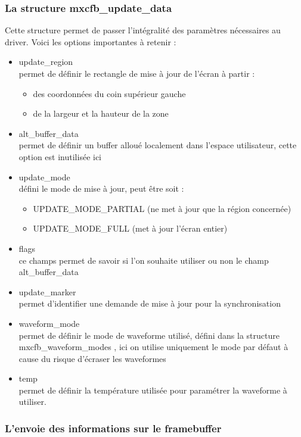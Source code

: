 \subsubsection{La structure mxcfb_update_data}
Cette structure permet de passer l'intégralité des paramètres nécessaires au driver.
Voici les options importantes à retenir : 
\begin{itemize}
	\renewcommand{\labelitemi}{$\bullet$}
	\item update_region \\
		permet de définir le rectangle de mise à jour de l'écran à partir :
		\begin{itemize}
			\item des coordonnées du coin supérieur gauche
			\item de la largeur et la hauteur de la zone
		\end{itemize}
	\item alt_buffer_data\\
		permet de définir un buffer alloué localement dans l'espace utilisateur, 
		cette option est inutilisée ici
		
	\item update_mode \\
		défini le mode de mise à jour, peut être soit :
		\begin{itemize}
			\item UPDATE_MODE_PARTIAL (ne met à jour que la région concernée)
			\item UPDATE_MODE_FULL (met à jour l'écran entier)
		\end{itemize}
	\item flags\\
		ce champs permet de savoir si l'on souhaite utiliser ou non le champ alt_buffer_data
	\item update_marker\\
		permet d'identifier une demande de mise à jour pour la synchronisation
	\item waveform_mode \\
		permet de définir le mode de waveforme utilisé, défini dans la structure
		mxcfb_waveform_modes , ici on utilise uniquement le mode par défaut à cause du risque 
		d'écraser les waveformes
	\item temp\\
		permet de définir la température utilisée pour paramétrer la waveforme à utiliser.
	
\end{itemize}

\subsubsection{L'envoie des informations sur le framebuffer}

